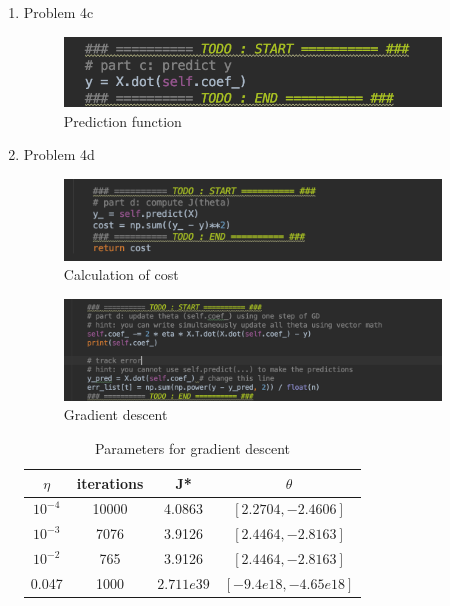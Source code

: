 \documentclass[11pt]{article}
\newcommand{\solution}[1]{{{\color{black}{\bf Solution:} {#1}}}}
\begin{document}
\begin{enumerate}
{	
	}
	\vspace{2cm}
	
	\item Problem 4c \newline
	
	\solution{
	
	\begin{figure}[h!]
	\centering
	\includegraphics[width = 10cm]{4c}
	\caption{Prediction function}
	\end{figure}
	
	
	}
	\vspace{2cm}
	
	\item Problem 4d \newline
	
	\solution{
	
	\begin{figure}[h!]
	\centering
	\includegraphics[width = 10cm]{4d}
	\caption{Calculation of cost}
	\end{figure}
	
	\begin{figure}[h!]
	\centering
	\includegraphics[width = 10cm]{4d2}
	\caption{Gradient descent}
	\end{figure}
	
	\begin{table}[h!]
	\caption{Parameters for gradient descent}
	\begin{center}
 	\begin{tabular}{||c c c c||} 
	 \hline
 	$\eta$ & iterations & J*  & $ \theta $ \\ [0.5ex] 
 	\hline\hline
 	$10^{-4}$ & 10000 & 4.0863 & $[2.2704, -2.4606]$\\ 
 	\hline
 	$10^{-3}$ & 7076 & 3.9126 & $[2.4464, -2.8163]$\\
 	\hline
 	$10^{-2}$ & 765 & 3.9126 & $[2.4464, -2.8163] $\\
 	\hline
 	0.047 & 1000 & $2.711e{39} $ & $[-9.4e18, -4.65e18]$ \\ [1ex]
 	\hline
	\end{tabular}
	\end{center}
	\end{table}
	
}
\end{enumerate}
\end{document}
